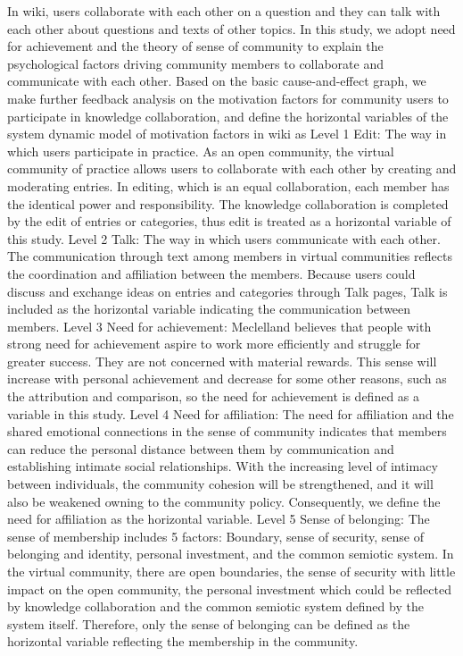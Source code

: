 \documentclass{elsarticle}
\begin{document}
In wiki, users collaborate with each other on a question and they can talk with each other about questions and texts of other topics. In this study, we adopt need for achievement and the theory of sense of community to explain the psychological factors driving community members to collaborate and communicate with each other. Based on the basic cause-and-effect graph, we make further feedback analysis on the motivation factors for community users to participate in knowledge collaboration, and define the horizontal variables of the system dynamic model of motivation factors in wiki as 
Level 1 Edit: The way in which users participate in practice. As an open community, the virtual community of practice allows users to collaborate with each other by creating and moderating entries. In editing, which is an equal collaboration, each member has the identical power and responsibility. The knowledge collaboration is completed by the edit of entries or categories, thus edit is treated as a horizontal variable of this study. 
Level 2 Talk: The way in which users communicate with each other. The communication through text among members in virtual communities reflects the coordination and affiliation between the members. Because users could discuss and exchange ideas on entries and categories through Talk pages, Talk is included as the horizontal variable indicating the communication between members. 
Level 3 Need for achievement: Meclelland believes that people with strong need for achievement aspire to work more efficiently and struggle for greater success. They are not concerned with material rewards. This sense will increase with personal achievement and decrease for some other reasons, such as the attribution and comparison, so the need for achievement is defined as a variable in this study.
Level 4 Need for affiliation: The need for affiliation and the shared
emotional connections in the sense of community indicates that members
can reduce the personal distance between them by communication and
establishing intimate social relationships. With the increasing level
of intimacy between individuals, the community cohesion will be
strengthened, and it will also be weakened owning to the community
policy. Consequently, we define the need for affiliation as the
horizontal variable.  
Level 5 Sense of belonging: The sense of membership includes 5 factors: Boundary, sense of security, sense of belonging and identity, personal investment, and the common semiotic system. In the virtual community, there are open boundaries, the sense of security with little impact on the open community, the personal investment which could be reflected by knowledge collaboration and the common semiotic system defined by the system itself. Therefore, only the sense of belonging can be defined as the horizontal variable reflecting the membership in the community.
\end{document}
